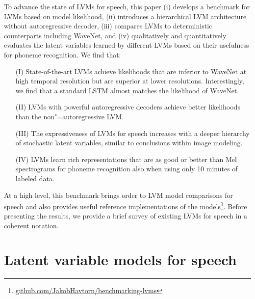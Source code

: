 {To advance the state of LVMs for speech, this paper (i) develops a benchmark for LVMs based on model likelihood, (ii) introduces a hierarchical LVM architecture without autoregressive decoder, (iii) compares LVMs to deterministic counterparts including WaveNet, and (iv) qualitatively and quantitatively evaluates the latent variables learned by different LVMs based on their usefulness for phoneme recognition. We find that:
\begin{itemize}[leftmargin=8mm]
    \setlength\itemsep{-0em}
    \item [(I)] State-of-the-art LVMs achieve likelihoods that are inferior to WaveNet at high temporal resolution but are superior at lower resolutions. Interestingly, we find that a standard LSTM \parencite{hochreiter_long_1997} almost matches the likelihood of WaveNet.
    \item [(II)] LVMs with powerful autoregressive decoders achieve better likelihoods than the non"=autoregressive LVM.
    \item[(III)] The expressiveness of LVMs for speech increases with a deeper hierarchy of stochastic latent variables, similar to conclusions within image modeling. %
    \item[(IV)] LVMs learn rich representations that are as good or better than Mel spectrograms for phoneme recognition also when using only 10 minutes of labeled data.
\end{itemize}
At a high level, this benchmark brings order to LVM model comparisons for speech and also provides useful reference implementations of the models\footnote{\href{https://github.com/JakobHavtorn/benchmarking-lvms}{\url{github.com/JakobHavtorn/benchmarking-lvms}}}.
Before presenting the results, we provide a brief survey of existing LVMs for speech in a coherent notation. 


\section{Latent variable models for speech}
\begin{figure*}[t]
    \centering
    \begin{multicols}{5}
\end{multicols}
\end{figure*}}
